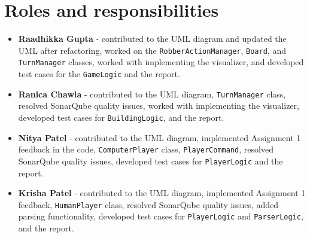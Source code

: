 \section{Roles and responsibilities}

\begin{itemize}
    \item {\textbf{Raadhikka Gupta} - contributed to the UML diagram and updated the UML after refactoring, worked on the \texttt{RobberActionManager}, \texttt{Board}, and \texttt{TurnManager} classes, worked with implementing the visualizer, and developed test cases for the \texttt{GameLogic} and the report.}
    \item {\textbf{Ranica Chawla} - contributed to the UML diagram, \texttt{TurnManager} class, resolved SonarQube quality issues, worked with implementing the visualizer, developed test cases for \texttt{BuildingLogic}, and the report.}
	\item {\textbf{Nitya Patel} - contributed to the UML diagram, implemented Assignment 1 feedback in the code, \texttt{ComputerPlayer} class, \texttt{PlayerCommand}, resolved SonarQube quality issues, developed test cases for \texttt{PlayerLogic} and the report.} 
	\item {\textbf{Krisha Patel} - contributed to the UML diagram, implemented Assignment 1 feedback, \texttt{HumanPlayer} class, resolved SonarQube quality issues, added parsing functionality, developed test cases for \texttt{PlayerLogic} and \texttt{ParserLogic}, and the report.}
\end{itemize}
